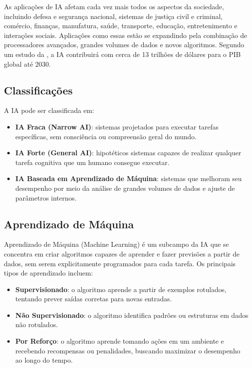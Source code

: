 As aplicações de IA afetam cada vez mais todos os aspectos da sociedade, incluindo defesa e segurança nacional, sistemas de justiça civil e criminal, comércio, finanças, manufatura, saúde, transporte, educação, entretenimento e interações sociais. Aplicações como essas estão se expandindo pela combinação de processadores avançados, grandes volumes de dados e novos algoritmos. Segundo um estudo da \citet{mckinsey2018-ai-impact}, a IA contribuirá com cerca de 13 trilhões de dólares para o PIB global até 2030.

\subsection{Classificações}

A IA pode ser classificada em:

\begin{itemize}
    \item \textbf{IA Fraca (Narrow AI)}: sistemas projetados para executar tarefas específicas, sem consciência ou compreensão geral do mundo.
    \item \textbf{IA Forte (General AI)}: hipotéticos sistemas capazes de realizar qualquer tarefa cognitiva que um humano consegue executar.
    \item \textbf{IA Baseada em Aprendizado de Máquina}: sistemas que melhoram seu desempenho por meio da análise de grandes volumes de dados e ajuste de parâmetros internos.
\end{itemize}

\subsection{Aprendizado de Máquina}

Aprendizado de Máquina (Machine Learning) é um subcampo da IA que se concentra em criar algoritmos capazes de aprender e fazer previsões a partir de dados, sem serem explicitamente programados para cada tarefa. Os principais tipos de aprendizado incluem:

\begin{itemize}
    \item \textbf{Supervisionado}: o algoritmo aprende a partir de exemplos rotulados, tentando prever saídas corretas para novas entradas.
    \item \textbf{Não Supervisionado}: o algoritmo identifica padrões ou estruturas em dados não rotulados.
    \item \textbf{Por Reforço}: o algoritmo aprende tomando ações em um ambiente e recebendo recompensas ou penalidades, buscando maximizar o desempenho ao longo do tempo.
\end{itemize}

